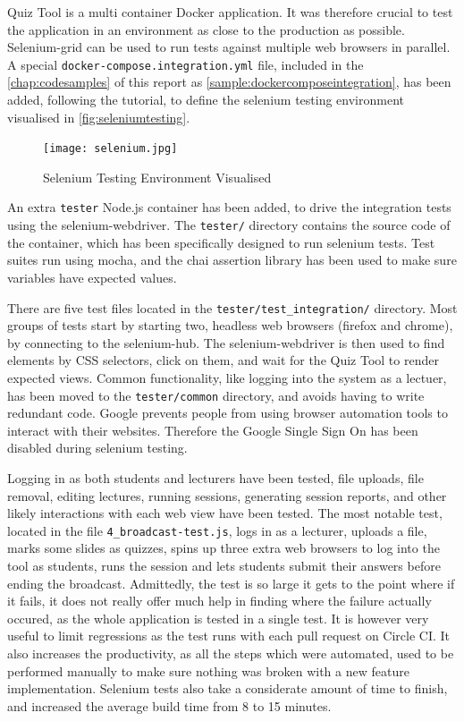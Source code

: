 Quiz Tool is a multi container Docker application. It was therefore crucial to test
the application in an environment as close to the production as possible.
Selenium-grid\cite{67} can be used to run tests against multiple web browsers in
parallel. A special \texttt{docker-compose.integration.yml} file, included in the
\autoref{chap:codesamples} of this report as \autoref{sample:dockercomposeintegration},
has been added, following the tutorial\cite{68}, to define the selenium testing
environment visualised in \autoref{fig:seleniumtesting}.

\begin{figure}[h!]
    \centering
    \texttt{[image: selenium.jpg]}
    \caption{Selenium Testing Environment Visualised}
    \label{fig:seleniumtesting}
\end{figure}

An extra \texttt{tester} Node.js container has been added, to drive the integration
tests using the selenium-webdriver\cite{69}. The \texttt{tester/} directory contains
the source code of the container, which has been specifically designed to run
selenium tests. Test suites run using mocha, and the chai assertion library has been
used to make sure variables have expected values.

There are five test files
located in the \texttt{tester/test\_integration/} directory. Most groups of
tests start by starting two, headless web browsers (firefox and chrome), by
connecting to the selenium-hub. The selenium-webdriver is then used to
find elements by CSS selectors, click on them, and wait for the Quiz
Tool to render expected views. Common functionality, like logging into the
system as a lectuer, has been moved to the \texttt{tester/common} directory,
and avoids having to write redundant code. Google prevents people from using
browser automation tools to interact with their websites. Therefore the Google
Single Sign On has been disabled during selenium testing.

\newpage
Logging in as both students and lecturers have been tested, file uploads,
file removal, editing lectures, running sessions, generating session
reports, and other likely interactions with each web view have been tested.
The most notable test, located in the file \texttt{4\_broadcast-test.js}, logs
in as a lecturer, uploads a file, marks some slides as quizzes, spins up
three extra web browsers to log into the tool as students, runs the session
and lets students submit their answers before ending the broadcast. Admittedly, the test
is so large it gets to the point where if it fails, it does not really offer
much help in finding where the failure actually occured, as the whole application
is tested in a single test. It is however very useful to limit regressions
as the test runs with each pull request on Circle CI. It also increases
the productivity, as all the steps which were automated, used to be performed
manually to make sure nothing was broken with a new feature implementation.
Selenium tests also take a considerate amount of time to finish, and increased
the average build time from 8 to 15 minutes.

